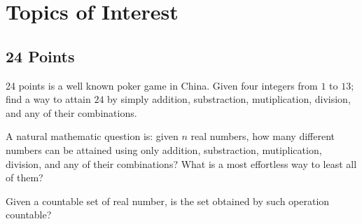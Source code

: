 \documentclass[12pt]{article}
\begin{document}
\section{Topics of Interest}
\subsection{24 Points}
24 points is a well known poker game in China.
Given four integers from $1$ to $13$; find a way to attain $24$ by simply addition, substraction, mutiplication, division, and any of their combinations.

A natural mathematic question is: given $n$ real numbers, how many different numbers can be attained using only addition, substraction, mutiplication, division, and any of their combinations? What is a most effortless way to least all of them?

Given a countable set of real number, is the set obtained by such operation countable? 
\end{document}
